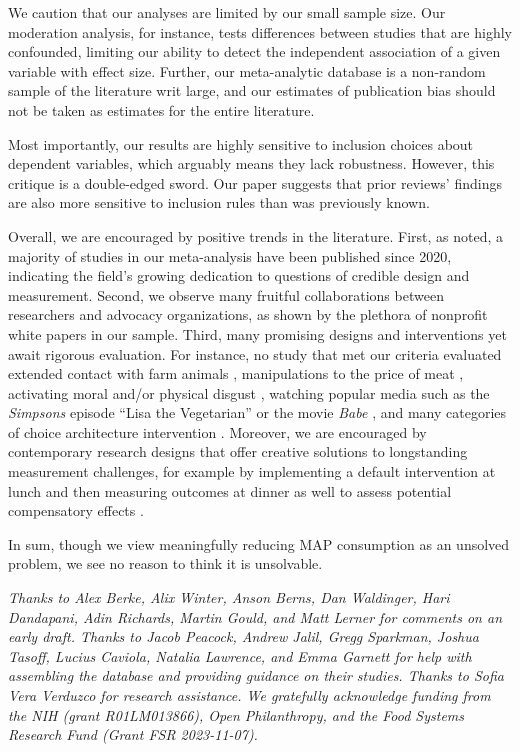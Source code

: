 \documentclass[sn-nature,referee,pdflatex]{sn-jnl}
\begin{document}
We caution that our analyses are limited by our small sample size. Our
moderation analysis, for instance, tests differences between studies
that are highly confounded, limiting our ability to detect the
independent association of a given variable with effect size. Further,
our meta-analytic database is a non-random sample of the literature writ
large, and our estimates of publication bias should not be taken as
estimates for the entire literature.

Most importantly, our results are highly sensitive to inclusion choices
about dependent variables, which arguably means they lack robustness.
However, this critique is a double-edged sword. Our paper suggests that
prior reviews' findings are also more sensitive to inclusion rules than
was previously known.

Overall, we are encouraged by positive trends in the literature. First,
as noted, a majority of studies in our meta-analysis have been published
since 2020, indicating the field's growing dedication to questions of
credible design and measurement. Second, we observe many fruitful
collaborations between researchers and advocacy organizations, as shown
by the plethora of nonprofit white papers in our sample. Third, many
promising designs and interventions yet await rigorous evaluation. For
instance, no study that met our criteria evaluated extended contact with
farm animals \citep{cerrato2022}, manipulations to the price of meat
\citep{wilde2016}, activating moral and/or physical disgust
\citep{palomo2018}, watching popular media such as the \emph{Simpsons}
episode ``Lisa the Vegetarian'' \citep{byrd2010} or the movie
\emph{Babe} \citep{novatna2019}, and many categories of choice
architecture intervention \citep{olafsson2024}. Moreover, we are
encouraged by contemporary research designs that offer creative
solutions to longstanding measurement challenges, for example by
implementing a default intervention at lunch and then measuring outcomes
at dinner as well to assess potential compensatory effects
\citep{vocski2024}.

In sum, though we view meaningfully reducing MAP consumption as an
unsolved problem, we see no reason to think it is unsolvable.


\emph{Thanks to Alex Berke, Alix Winter, Anson Berns, Dan Waldinger,
Hari Dandapani, Adin Richards, Martin Gould, and Matt Lerner for
comments on an early draft. Thanks to Jacob Peacock, Andrew Jalil, Gregg
Sparkman, Joshua Tasoff, Lucius Caviola, Natalia Lawrence, and Emma
Garnett for help with assembling the database and providing guidance on
their studies. Thanks to Sofia Vera Verduzco for research assistance. We
gratefully acknowledge funding from the NIH (grant R01LM013866), Open
Philanthropy, and the Food Systems Research Fund (Grant FSR
2023-11-07).}
\end{document}
